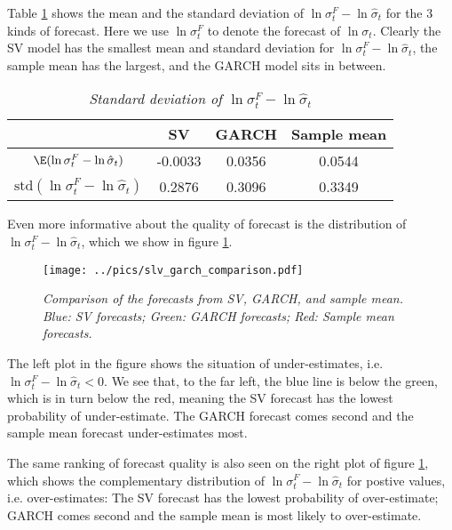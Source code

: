 Table \ref{tab:slv_garch_comparison} shows the mean and the standard
deviation of $\ln \sigma^F_t - \ln \hat{\sigma}_t$ for the 3 kinds of
forecast. Here we use $\ln \sigma^F_t$ to denote the forecast of $\ln
\sigma_t$. Clearly the SV model has the smallest mean and standard
deviation for $\ln \sigma^F_t - \ln \hat{\sigma}_t$, the sample mean
has the largest, and the GARCH model sits in between.
\begin{table}[htb!]
  \centering
  \begin{tabular}{|c|c|c|c|}
    \hline
    & SV & GARCH & Sample mean \\
    \hline
    $\E(\ln \sigma^F_t - \ln \hat{\sigma}_t)$ & -0.0033 & 0.0356 &
    0.0544 \\
    \hline
    $\text{std}(\ln \sigma^F_t - \ln \hat{\sigma}_t)$ &
    0.2876  &  0.3096 &   0.3349 \\
    \hline
  \end{tabular}
  \caption{\small \it Standard deviation of $\ln\sigma^F_t -
    \ln\hat{\sigma}_t$}
  \label{tab:slv_garch_comparison}
\end{table}
Even more informative about the quality of forecast is the
distribution of $\ln \sigma^F_t - \ln \hat{\sigma}_t$, which we show
in figure \ref{fig:slv_garch_comparison}.
\begin{figure}[htb!]
  \centering
  \texttt{[image: ../pics/slv\_garch\_comparison.pdf]}
  \caption{\small \it Comparison of the forecasts from SV, GARCH,
    and sample mean. Blue: SV forecasts; Green: GARCH forecasts; Red:
    Sample mean forecasts.}
  \label{fig:slv_garch_comparison}
\end{figure}
The left plot in the figure shows the situation of under-estimates,
i.e. $\ln \sigma^F_t - \ln \hat{\sigma}_t < 0$. We see that, to the
far left, the blue line is below the green, which is in turn below the
red, meaning the SV forecast has the lowest probability of
under-estimate. The GARCH forecast comes second and the sample
mean forecast under-estimates most.

The same ranking of forecast quality is also seen on the right plot of
figure \ref{fig:slv_garch_comparison}, which shows the complementary
distribution of $\ln \sigma^F_t - \ln \hat{\sigma}_t$ for postive
values, i.e. over-estimates: The SV forecast has the lowest
probability of over-estimate; GARCH comes second and the sample mean
is most likely to over-estimate.

